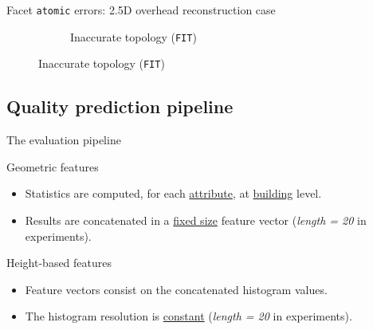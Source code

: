 \documentclass[10pt, export]{beamer}
\begin{document}
\begin{frame}{Facet \texttt{atomic} errors: 2.5D overhead reconstruction case}
{\begin{figure}
\begin{center}
\begin{subfigure}{.45\textwidth}
                                \caption{\label{fig::fac_height} Inaccurate topology (\texttt{FIT})}
                            \end{subfigure}
                        \end{center}
                    \end{figure}
                }
            \end{frame}
        \subsection{Quality prediction pipeline}
            \begin{frame}{The evaluation pipeline}
                \begin{figure}
                    
                \end{figure}
            \end{frame}
            \begin{frame}{Geometric features}
                \begin{figure}
                    
                \end{figure}
                \begin{itemize}[label=$\blacktriangleright$, font=\color{IGNGreen}]
                    \item<2-> \footnotesize Statistics are computed, for each \underline{attribute}, at \underline{building} level.
                    \item<3-> \footnotesize Results are concatenated in a \underline{fixed size} feature vector (\textit{length = 20} in experiments).
                \end{itemize}
            \end{frame}
            \begin{frame}{Height-based features}
                \begin{figure}
                    
                \end{figure}
                \begin{itemize}[label=$\blacktriangleright$, font=\color{IGNGreen}]
                    \item<2-> \footnotesize Feature vectors consist on the concatenated histogram values.
                    \item<3-> \footnotesize The histogram resolution is \underline{constant} (\textit{length = 20} in experiments).
                \end{itemize}
            \end{frame}
\end{document}
